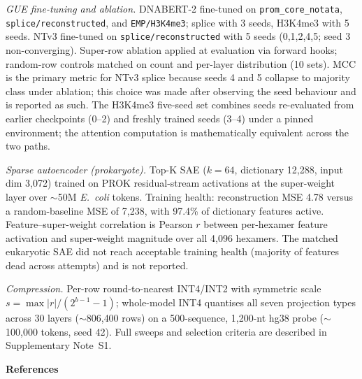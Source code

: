 \documentclass[11pt]{article}
\begin{document}
\textit{GUE fine-tuning and ablation.}
DNABERT-2 fine-tuned on \texttt{prom\_core\_notata},
\texttt{splice/reconstructed}, and \texttt{EMP/H3K4me3}; splice with 3
seeds, H3K4me3 with 5 seeds. NTv3 fine-tuned on
\texttt{splice/reconstructed} with 5 seeds (0,1,2,4,5; seed 3
non-converging). Super-row ablation applied at evaluation via forward
hooks; random-row controls matched on count and per-layer distribution
(10 sets). MCC is the primary metric for NTv3 splice because seeds 4 and
5 collapse to majority class under ablation; this choice was made after
observing the seed behaviour and is reported as such. The H3K4me3
five-seed set combines seeds re-evaluated from earlier checkpoints
(0--2) and freshly trained seeds (3--4) under a pinned environment; the
attention computation is mathematically equivalent across the two paths.

\textit{Sparse autoencoder (prokaryote).}
Top-K SAE ($k=64$, dictionary 12{,}288, input dim 3{,}072) trained on
PROK residual-stream activations at the super-weight layer over
$\sim$50M \textit{E.~coli} tokens. Training health: reconstruction MSE
4.78 versus a random-baseline MSE of 7{,}238, with 97.4\% of dictionary
features active. Feature--super-weight correlation is Pearson $r$
between per-hexamer feature activation and super-weight magnitude over
all 4{,}096 hexamers. The matched eukaryotic SAE did not reach
acceptable training health (majority of features dead across attempts)
and is not reported.

\textit{Compression.}
Per-row round-to-nearest INT4/INT2 with symmetric scale
$s=\max|r|/(2^{b-1}-1)$; whole-model INT4 quantises all seven projection
types across 30 layers ($\sim$806{,}400 rows) on a 500-sequence,
1{,}200-nt hg38 probe ($\sim$100{,}000 tokens, seed 42). Full sweeps and
selection criteria are described in Supplementary Note~S1.

\textbf{References}
\end{document}
